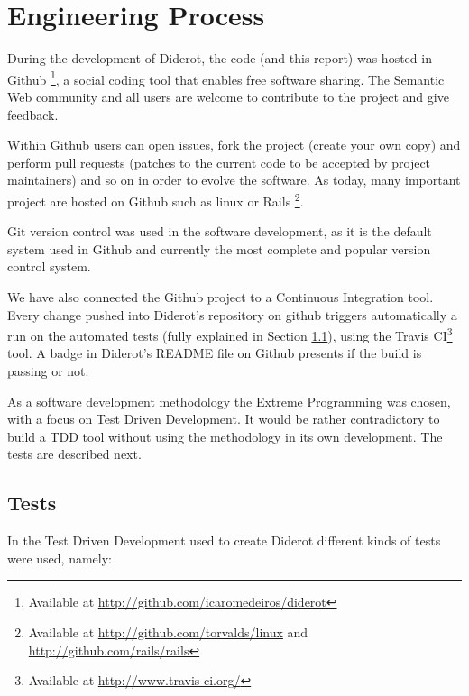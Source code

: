\documentclass{report}
\begin{document}
\section{Engineering Process}

During the development of Diderot, the code (and this report) was hosted in Github
\footnote{Available at \url{http://github.com/icaromedeiros/diderot}}, a social coding tool that enables free software
sharing. The Semantic Web community and all users are welcome to contribute to the project and give feedback.

Within Github users can open issues, fork the project (create your own copy) and perform pull requests (patches to the
current code to be accepted by project maintainers) and so on in order to evolve the software. As today, many
important project are hosted on Github such as linux or Rails \footnote{Available at \url{http://github.com/torvalds/linux}
and \url{http://github.com/rails/rails}}.

Git version control was used in the software development, as it is the
default system used in Github and currently the most complete and popular version control system.

We have also connected the Github project to a Continuous Integration tool\cite{beck04}. Every change pushed into Diderot's repository on github triggers automatically a run on the automated tests (fully explained in Section \ref{tests}), using the Travis CI\footnote{Available at \url{http://www.travis-ci.org/}} tool. A badge in Diderot's README file on Github presents if the build is passing or not.

As a software development methodology the Extreme Programming \cite{beck04} was chosen, with a focus on Test Driven
Development. It would be rather contradictory to build a TDD tool without using the methodology in its own development.
The tests are described next.

\subsection{Tests}
\label{tests}

In the Test Driven Development used to create Diderot different kinds of tests were used, namely:
\end{document}
